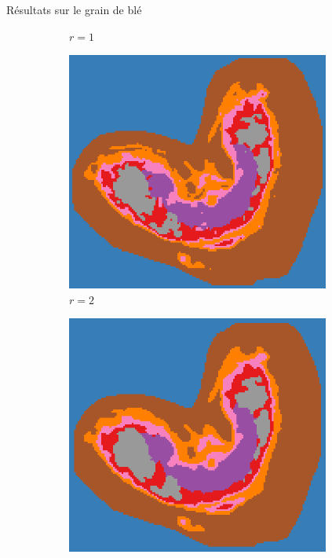 \documentclass[10pt]{beamer}
\begin{document}
\begin{frame}{Résultats sur le grain de blé}
\begin{figure}[ht]
\begin{subfigure}[t]{0.25\textwidth}
      \caption{$r=1$}
      \label{subfig:peaksel_prominence75_r1_full_colors}
    \end{subfigure}%
    \begin{subfigure}[t]{0.25\textwidth}
      \centering
      \includegraphics[width=0.95\textwidth]{fig/peaksel_prominence75_r2_full_colors}
      \caption{$r=2$}
      \label{subfig:peaksel_prominence75_r2_full_colors}
    \end{subfigure}%
    \begin{subfigure}[t]{0.25\textwidth}
      \centering
      \includegraphics[width=0.95\textwidth]{fig/peaksel_prominence75_r3_full_colors}

\end{subfigure}
\end{figure}
\end{frame}
\end{document}
